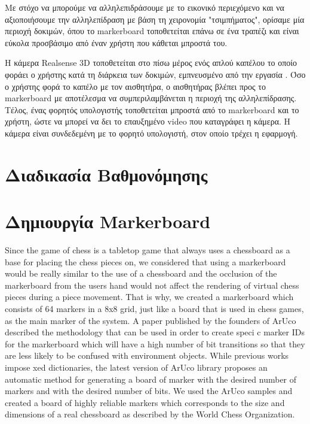 Με στόχο να μπορούμε να αλληλεπιδράσουμε με το εικονικό περιεχόμενο και να αξιοποιήσουμε την αλληλεπίδραση με βάση τη χειρονομία "τσιμπήματος", ορίσαμε μία περιοχή δοκιμών, όπου το markerboard τοποθετείται επάνω σε ένα τραπέζι και είναι εύκολα προσβάσιμο από έναν χρήστη που κάθεται μπροστά του. 

Η κάμερα Realsense 3D τοποθετείται στο πίσω μέρος ενός απλού καπέλου το οποίο φοράει ο χρήστης κατά τη διάρκεια των δοκιμών, εμπνευσμένο από την εργασία \cite{Mathews2007}. Όσο ο χρήστης φορά το καπέλο με τον αισθητήρα, ο αισθητήρας βλέπει προς το markerboard με αποτέλεσμα να συμπεριλαμβάνεται η περιοχή της αλληλεπίδρασης. Τέλος, ένας φορητός υπολογιστής τοποθετείται μπροστά από το markerboard και το χρήστη, ώστε να μπορεί να δει το επαυξημένο video που καταγράφει η κάμερα. Η κάμερα είναι συνδεδεμένη με το φορητό υπολογιστή, στον οποίο τρέχει η εφαρμογή. 


\section{Διαδικασία Βαθμονόμησης}

\section{Δημιουργία Markerboard}


Since the game of chess is a tabletop game that always uses a chessboard as a base for placing the chess pieces on, we considered that using a markerboard would be really similar to the use of a chessboard and the occlusion of the markerboard from the users hand would not affect the rendering of virtual chess pieces during a piece movement. That is why, we created a markerboard which consists of 64 markers in a 8x8 grid, just like a board that is used in chess games, as the main marker of the system. A paper published by the founders of ArUco described the methodology that can be used in order to create speci c marker IDs for the markerboard which will have a high number of bit transitions so that they are less likely to be confused with environment objects. While previous works impose xed dictionaries, the latest version of ArUco library proposes an automatic method for generating a board of marker with the desired number of markers and with the desired number of bits. We used the ArUco samples and created a board of highly reliable markers which corresponds to the size and dimensions of a real chessboard as described by the World Chess Organization.



